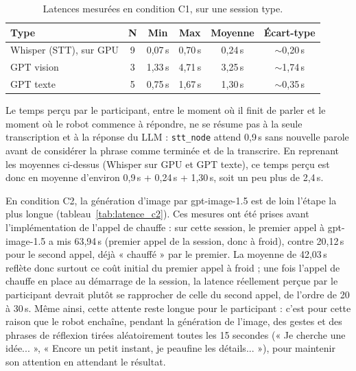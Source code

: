 \documentclass[11pt]{article}
\begin{document}
\begin{table}[H]
    \centering
    \begin{tabular}{@{}lccccc@{}}
        \toprule
        \textbf{Type} & \textbf{N} & \textbf{Min} & \textbf{Max} & \textbf{Moyenne} & \textbf{Écart-type} \\
        \midrule
        Whisper (STT), sur GPU      & 9 & 0,07\,s & 0,70\,s & 0,24\,s & $\sim$0,20\,s \\
        GPT vision                  & 3 & 1,33\,s & 4,71\,s & 3,25\,s & $\sim$1,74\,s \\
        GPT texte                  & 5 & 0,75\,s & 1,67\,s & 1,30\,s & $\sim$0,35\,s \\
        \bottomrule
    \end{tabular}
    \caption{Latences mesurées en condition C1, sur une session type.}
    \label{tab:latence_c1}
\end{table}

Le temps perçu par le participant, entre le moment où il finit de parler et le moment où le robot commence à répondre, ne se résume pas à la seule transcription et à la réponse du LLM : \texttt{stt\_node} attend 0,9\,s sans nouvelle parole avant de considérer la phrase comme terminée et de la transcrire.
En reprenant les moyennes ci-dessus (Whisper sur GPU et GPT texte), ce temps perçu est donc en moyenne d'environ 0,9\,s + 0,24\,s + 1,30\,s, soit un peu plus de 2,4\,s.

En condition C2, la génération d'image par gpt-image-1.5 est de loin l'étape la plus longue (tableau~\ref{tab:latence_c2}).
Ces mesures ont été prises avant l'implémentation de l'appel de chauffe : sur cette session, le premier appel à gpt-image-1.5 a mis 63,94\,s (premier appel de la session, donc à froid), contre 20,12\,s pour le second appel, déjà « chauffé » par le premier.
La moyenne de 42,03\,s reflète donc surtout ce coût initial du premier appel à froid ; une fois l'appel de chauffe en place au démarrage de la session, la latence réellement perçue par le participant devrait plutôt se rapprocher de celle du second appel, de l'ordre de 20 à 30\,s.
Même ainsi, cette attente reste longue pour le participant : c'est pour cette raison que le robot enchaîne, pendant la génération de l'image, des gestes et des phrases de réflexion tirées aléatoirement toutes les 15 secondes (« Je cherche une idée... », « Encore un petit instant, je peaufine les détails... »), pour maintenir son attention en attendant le résultat.
\end{document}
